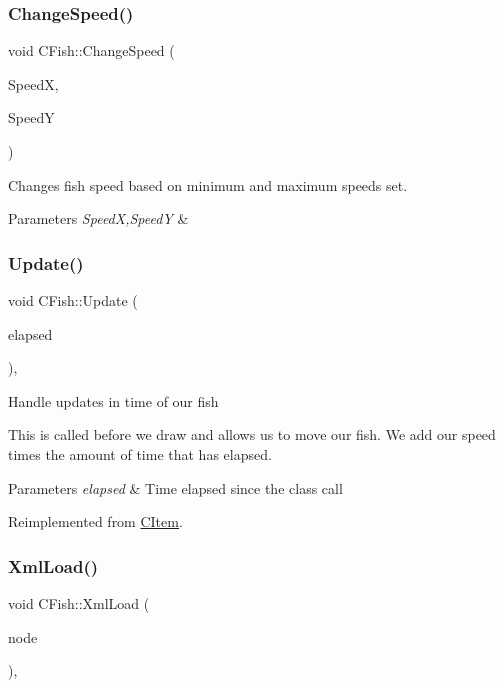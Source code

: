 \subsubsection{\texorpdfstring{Change\+Speed()}{ChangeSpeed()}}
{\footnotesize\ttfamily void C\+Fish\+::\+Change\+Speed (\begin{DoxyParamCaption}\item[{int}]{SpeedX,  }\item[{int}]{SpeedY }\end{DoxyParamCaption})}

Changes fish speed based on minimum and maximum speeds set. 
\begin{DoxyParams}{Parameters}
{\em SpeedX,SpeedY} & \\
\hline
\end{DoxyParams}
\mbox{\label{class_c_fish_a1f32288b28d3c1f186bd51cf8ac71aeb}} 
\subsubsection{\texorpdfstring{Update()}{Update()}}
{\footnotesize\ttfamily void C\+Fish\+::\+Update (\begin{DoxyParamCaption}\item[{double}]{elapsed }\end{DoxyParamCaption})\hspace{0.3cm}{\ttfamily [protected]}, {\ttfamily [virtual]}}

Handle updates in time of our fish

This is called before we draw and allows us to move our fish. We add our speed times the amount of time that has elapsed. 
\begin{DoxyParams}{Parameters}
{\em elapsed} & Time elapsed since the class call \\
\hline
\end{DoxyParams}


Reimplemented from \mbox{\hyperlink{class_c_item_a0e88df0b5e12a93941dcec378797d0fe}{C\+Item}}.

\mbox{\label{class_c_fish_a997f243d89dd8c397597010eec4b611e}} 
\subsubsection{\texorpdfstring{Xml\+Load()}{XmlLoad()}}
{\footnotesize\ttfamily void C\+Fish\+::\+Xml\+Load (\begin{DoxyParamCaption}\item[{const std\+::shared\+\_\+ptr$<$ \mbox{\hyperlink{classxmlnode_1_1_c_xml_node}{xmlnode\+::\+C\+Xml\+Node}} $>$ \&}]{node }\end{DoxyParamCaption})\hspace{0.3cm}{\ttfamily [override]}, {\ttfamily [virtual]}}


